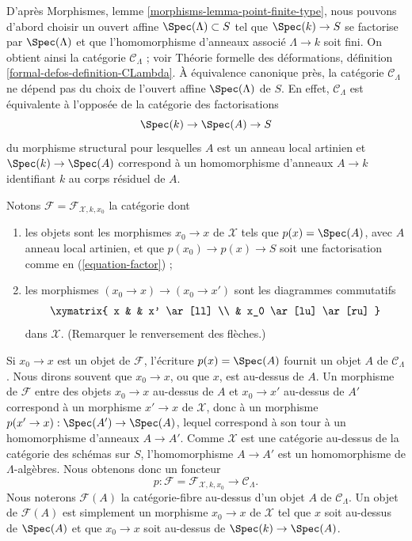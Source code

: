 \medskip\noindent
D'après Morphismes, lemme \ref{morphisms-lemma-point-finite-type}, nous pouvons
d'abord choisir un ouvert affine $\Spec(\Lambda) \subset S$ tel que
$\Spec(k) \to S$ se factorise par $\Spec(\Lambda)$ et que l'homomorphisme
d'anneaux associé $\Lambda \to k$ soit fini. On obtient ainsi la catégorie
$\mathcal{C}_\Lambda$ ; voir Théorie formelle des déformations, définition
\ref{formal-defos-definition-CLambda}. À équivalence canonique près, la
catégorie $\mathcal{C}_\Lambda$ ne dépend pas du choix de l'ouvert affine
$\Spec(\Lambda)$ de $S$. En effet, $\mathcal{C}_\Lambda$ est équivalente à
l'opposée de la catégorie des factorisations
\begin{equation}
\label{equation-factor}
\Spec(k) \to \Spec(A) \to S
\end{equation}
du morphisme structural pour lesquelles $A$ est un anneau local artinien et
$\Spec(k) \to \Spec(A)$ correspond à un homomorphisme d'anneaux $A \to k$
identifiant $k$ au corps résiduel de $A$.

\medskip\noindent
Notons $\mathcal{F} = \mathcal{F}_{\mathcal{X}, k, x_0}$ la catégorie dont
\begin{enumerate}
\item les objets sont les morphismes $x_0 \to x$ de $\mathcal{X}$ tels que
$p(x) = \Spec(A)$, avec $A$ anneau local artinien, et que
$p(x_0) \to p(x) \to S$ soit une factorisation comme en
(\ref{equation-factor}) ;
\item les morphismes $(x_0 \to x) \to (x_0 \to x')$ sont les diagrammes
commutatifs
$$
\xymatrix{
x & & x' \ar[ll] \\
& x_0 \ar[lu] \ar[ru]
}
$$
dans $\mathcal{X}$. (Remarquer le renversement des flèches.)
\end{enumerate}
Si $x_0 \to x$ est un objet de $\mathcal{F}$, l'écriture
$p(x) = \Spec(A)$ fournit un objet $A$ de $\mathcal{C}_\Lambda$. Nous dirons
souvent que $x_0 \to x$, ou que $x$, est au-dessus de $A$. Un morphisme de
$\mathcal{F}$ entre des objets $x_0 \to x$ au-dessus de $A$ et
$x_0 \to x'$ au-dessus de $A'$ correspond à un morphisme $x' \to x$ de
$\mathcal{X}$, donc à un morphisme
$p(x' \to x) : \Spec(A') \to \Spec(A)$, lequel correspond à son tour à un
homomorphisme d'anneaux $A \to A'$. Comme $\mathcal{X}$ est une catégorie
au-dessus de la catégorie des schémas sur $S$, l'homomorphisme $A \to A'$ est
un homomorphisme de $\Lambda$-algèbres. Nous obtenons donc un foncteur
\begin{equation}
\label{equation-predeformation-category}
p : \mathcal{F} = \mathcal{F}_{\mathcal{X}, k, x_0}
\longrightarrow
\mathcal{C}_\Lambda.
\end{equation}
Nous noterons $\mathcal{F}(A)$ la catégorie-fibre au-dessus d'un objet $A$ de
$\mathcal{C}_\Lambda$. Un objet de $\mathcal{F}(A)$ est simplement un
morphisme $x_0 \to x$ de $\mathcal{X}$ tel que $x$ soit au-dessus de
$\Spec(A)$ et que $x_0 \to x$ soit au-dessus de
$\Spec(k) \to \Spec(A)$.

